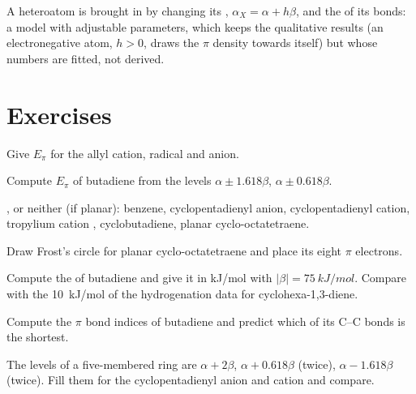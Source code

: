 A heteroatom is brought in by changing its , $\alpha_X = \alpha + h\beta$, and the
 of its bonds: a model with adjustable parameters, which keeps the
qualitative results (an electronegative atom, $h > 0$, draws the $\pi$ density towards
itself) but whose numbers are fitted, not derived.

\section{Exercises}

\begin{exercise}[$\star$]\label{exo:b2:huckel:1}
Give $E_\pi$ for the allyl cation, radical and anion.
\end{exercise}

\begin{exercise}[$\star$]\label{exo:b2:huckel:2}
Compute $E_\pi$ of butadiene from the levels $\alpha \pm 1.618\beta$, $\alpha \pm 0.618\beta$.
\end{exercise}

\begin{exercise}[$\star$]\label{exo:b2:huckel:3}
,  or neither (if planar): benzene, cyclopentadienyl anion,
cyclopentadienyl cation, tropylium cation , cyclobutadiene, planar
cyclo-octatetraene.
\end{exercise}

\begin{exercise}[$\star$]\label{exo:b2:huckel:4}
Draw Frost's circle for planar cyclo-octatetraene and place its eight $\pi$ electrons.
\end{exercise}

\begin{exercise}[$\star\star$]\label{exo:b2:huckel:5}
Compute the  of butadiene and give it in \unit{kJ/mol} with
$|\beta| = \qty{75}{kJ/mol}$. Compare with the \qty{10}{kJ/mol} of the hydrogenation
data for cyclohexa-1,3-diene.
\end{exercise}

\begin{exercise}[$\star\star$]\label{exo:b2:huckel:6}
Compute the $\pi$ bond indices of butadiene and predict which of its C--C bonds is the
shortest.
\end{exercise}

\begin{exercise}[$\star\star$]\label{exo:b2:huckel:7}
The levels of a five-membered ring are $\alpha + 2\beta$, $\alpha + 0.618\beta$ (twice),
$\alpha - 1.618\beta$ (twice). Fill them for the cyclopentadienyl anion and cation and
compare.
\end{exercise}


